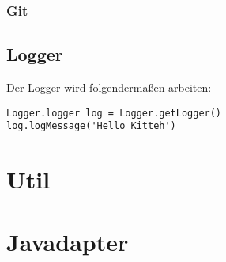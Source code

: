 \subsubsection{Git}
\label{ssub:git}




\subsection{Logger}
\label{sub:logger}
Der Logger wird folgendermaßen arbeiten:
\begin{verbatim}
Logger.logger log = Logger.getLogger()
log.logMessage('Hello Kitteh')
\end{verbatim}


\section{Util} 
\label{sec:util}



\section{Javadapter} 
\label{sec:javadapter}


